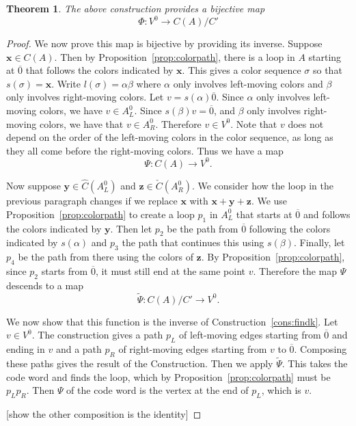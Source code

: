\documentclass[12pt,twoside,singlespace]{article}
\numberwithin{equation}{section}
\newtheorem{thm}[equation]{Theorem}
\theoremstyle{definition}
\renewcommand{\vec}[1]{\mathbf{#1}}
\begin{document}
\begin{thm}
\label{thm:findk}
The above construction provides a bijective map
\[\Phi:V^0\to C(A)/C'\]
\end{thm}
\begin{proof}

We now prove this map is bijective by providing its inverse.  Suppose $\vec{x}\in C(A)$.  Then by Proposition~\ref{prop:colorpath}, there is a loop in $A$ starting at $\overline{0}$ that follows the colors indicated by $\vec{x}$.  This gives a color sequence $\sigma$ so that $s(\sigma)=\vec{x}$.  Write $l(\sigma)=\alpha\beta$ where $\alpha$ only involves left-moving colors and $\beta$ only involves right-moving colors.  Let $v=s(\alpha)\overline{0}$.  Since $\alpha$ only involves left-moving colors, we have $v\in A_L^0$.  Since $s(\beta)v=\overline{0}$, and $\beta$ only involves right-moving colors, we have that $v\in A_R^0$.  Therefore $v\in V^0$.  Note that $v$ does not depend on the order of the left-moving colors in the color sequence, as long as they all come before the right-moving colors.  Thus we have a map
\[\Psi: C(A)  \to V^0.\]

Now suppose $\vec{y}\in \hat{C}(A_L^0)$ and $\vec{z}\in \check{C}(A_R^0)$.  We consider how the loop in the previous paragraph changes if we replace $\vec{x}$ with $\vec{x}+\vec{y}+\vec{z}$.  We use Proposition~\ref{prop:colorpath} to create a loop $p_1$ in $A_L^0$ that starts at $\overline{0}$ and follows the colors indicated by $\vec{y}$.  Then let $p_2$ be the path from $\overline{0}$ following the colors indicated by $s(\alpha)$ and $p_3$ the path that continues this using $s(\beta)$.  Finally, let $p_4$ be the path from there using the colors of $\vec{z}$.  By Proposition~\ref{prop:colorpath}, since $p_2$ starts from $\overline{0}$, it must still end at the same point $v$.  Therefore the map $\Psi$ descends to a map
\[\tilde{\Psi}:C(A)/C' \to V^0.\]

We now show that this function is the inverse of Construction~\ref{cons:findk}.  Let $v\in V^0$.  The construction gives a path $p_L$ of left-moving edges starting from $\overline{0}$ and ending in $v$ and a path $p_R$ of right-moving edges starting from $v$ to $\overline{0}$.  Composing these paths gives the result of the Construction.  Then we apply $\tilde{\Psi}$.  This takes the code word and finds the loop, which by Proposition~\ref{prop:colorpath} must be $p_Lp_R$.  Then $\Psi$ of the code word is the vertex at the end of $p_L$, which is $v$.


[show the other composition is the identity]

\end{proof}
\end{document}
